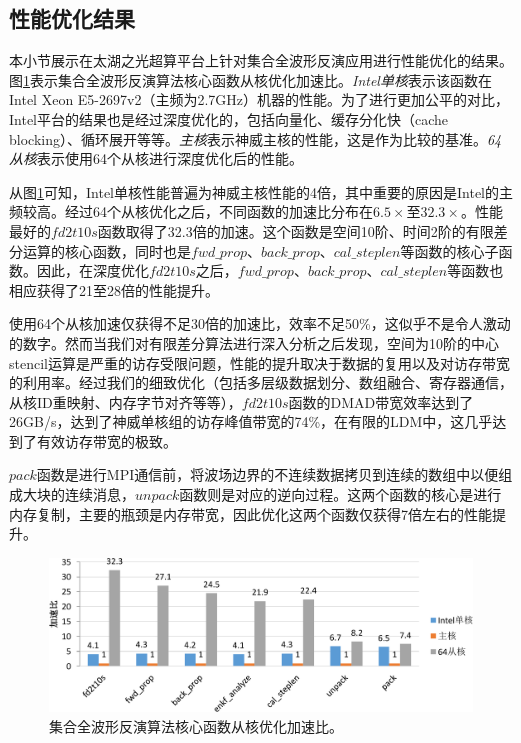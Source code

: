 \documentclass[degree=doctor]{thuthesis}
\begin{document}
\subsection{性能优化结果}

本小节展示在太湖之光超算平台上针对集合全波形反演应用进行性能优化的结果。图\ref{fig:集合全波形反演算法核心函数从核优化加速比}表示集合全波形反演算法核心函数从核优化加速比。\emph{Intel单核}表示该函数在Intel Xeon E5-2697v2（主频为2.7GHz）机器的性能。为了进行更加公平的对比，Intel平台的结果也是经过深度优化的，包括向量化、缓存分化快（cache blocking）、循环展开等等。\emph{主核}表示神威主核的性能，这是作为比较的基准。\emph{64从核}表示使用64个从核进行深度优化后的性能。

从图\ref{fig:集合全波形反演算法核心函数从核优化加速比}可知，Intel单核性能普遍为神威主核性能的4倍，其中重要的原因是Intel的主频较高。经过64个从核优化之后，不同函数的加速比分布在$6.5\times$至$32.3\times$。性能最好的$fd2t10s$函数取得了32.3倍的加速。这个函数是空间10阶、时间2阶的有限差分运算的核心函数，同时也是$fwd\_prop$、$back\_prop$、$cal\_steplen$等函数的核心子函数。因此，在深度优化$fd2t10s$之后，$fwd\_prop$、$back\_prop$、$cal\_steplen$等函数也相应获得了21至28倍的性能提升。

使用64个从核加速仅获得不足30倍的加速比，效率不足50\%，这似乎不是令人激动的数字。然而当我们对有限差分算法进行深入分析之后发现，空间为10阶的中心stencil运算是严重的访存受限问题，性能的提升取决于数据的复用以及对访存带宽的利用率。经过我们的细致优化（包括多层级数据划分、数组融合、寄存器通信，从核ID重映射、内存字节对齐等等），$fd2t10s$函数的DMAD带宽效率达到了26GB/s，达到了神威单核组的访存峰值带宽的74\%，在有限的LDM中，这几乎达到了有效访存带宽的极致。

$pack$函数是进行MPI通信前，将波场边界的不连续数据拷贝到连续的数组中以便组成大块的连续消息，$unpack$函数则是对应的逆向过程。这两个函数的核心是进行内存复制，主要的瓶颈是内存带宽，因此优化这两个函数仅获得7倍左右的性能提升。

\begin{figure}[ht]
\centering
\includegraphics[width=0.9\columnwidth]{enfwi不同函数优化加速比-crop.pdf}
\caption{集合全波形反演算法核心函数从核优化加速比。}
\label{fig:集合全波形反演算法核心函数从核优化加速比}
\end{figure}
\end{document}
